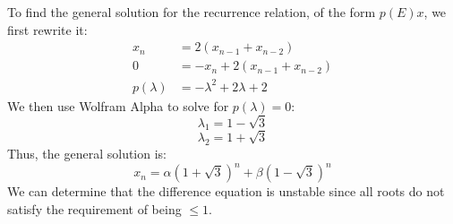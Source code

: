 To find the general solution for the recurrence relation, of the form $p(E)x$, we first rewrite it:
\begin{align*}
  x_n &= 2(x_{n-1}+x_{n-2}) \\
  0 &= -x_n + 2(x_{n-1}+x_{n-2}) \\
  p(\lambda) &=  -\lambda^2 + 2\lambda  + 2
\end{align*}
We then use Wolfram Alpha to solve for $p(\lambda) = 0$:
$$
\lambda_1 = 1 - \sqrt{3}
$$
$$
\lambda_2 = 1 + \sqrt{3}
$$
Thus, the general solution is:
$$
x_n = \alpha(1+\sqrt{3})^n + \beta(1-\sqrt{3})^n
$$
We can determine that the difference equation is unstable since all roots do not satisfy the requirement of being $\leq 1$.
